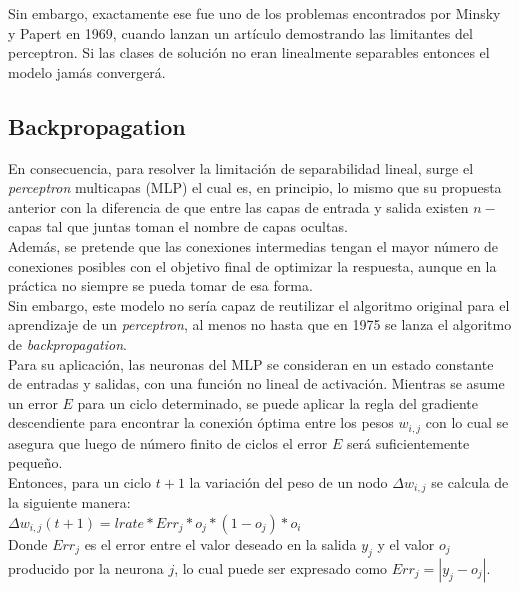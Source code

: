 \documentclass{llncs}
\begin{document}
Sin embargo, exactamente ese fue uno de los problemas encontrados por Minsky y \-Papert en 1969, cuando lanzan un art\'iculo demostrando las limitantes
del perceptron. Si las clases de soluci\'on no eran linealmente separables entonces el modelo jam\'as converger\'a.

\subsection{Backpropagation}

En consecuencia, para resolver la limitaci\'on de separabilidad lineal, surge el \textit{perceptron} multicapas (MLP) el cual es, en principio, lo mismo que su propuesta
anterior con la diferencia de que entre las capas de entrada y salida existen $n-$capas tal que juntas toman el nombre de capas ocultas.\\
Adem\'as, se pretende que las conexiones intermedias tengan el mayor n\'umero de conexiones posibles con el objetivo final de optimizar la respuesta, aunque
en la pr\'actica no siempre se pueda tomar de esa forma.\\


Sin embargo, este modelo no ser\'ia capaz de reutilizar el algoritmo original para el aprendizaje de un \textit{perceptron}, al menos no hasta que en 1975 se lanza el
algoritmo de \textit{backpropagation}. \\

Para su aplicaci\'on, las neuronas del MLP se consideran en un estado constante de entradas y salidas, con una funci\'on no lineal de activaci\'on. Mientras se
asume un error $E$ para un ciclo determinado, se puede aplicar la regla del gradiente descendiente para encontrar la conexi\'on \'optima entre los pesos $w_{i,j}$
con lo cual se asegura que luego de n\'umero finito de ciclos el error $E$ ser\'a suficientemente peque\~no.\\

Entonces, para un ciclo $t+1$ la variaci\'on del peso de un nodo $\Delta w_{i,j}$ se calcula de la siguiente manera: \\

$\Delta w_{i,j} (t + 1) = lrate * Err_{j} * o_j * (1 - o_j) * o_i$ \\

Donde $Err_j$ es el error entre el valor deseado en la salida $y_j$ y el valor $o_j$ producido por la neurona $j$, lo cual puede ser expresado como $Err_j = |y_j - o_j|$. \\
\end{document}
